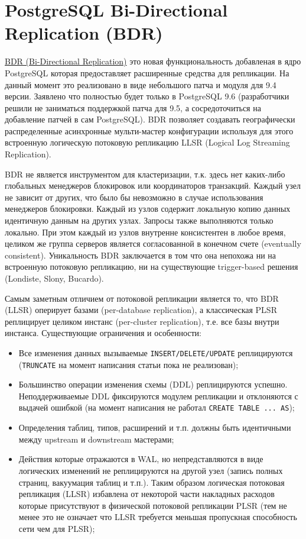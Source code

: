 \section{PostgreSQL Bi-Directional Replication (BDR)}
\label{sec:bdr}

\href{https://2ndquadrant.com/en/resources/bdr/}{BDR (Bi-Directional Replication)} это новая функциональность добавленая в ядро PostgreSQL которая предоставляет расширенные средства для репликации. На данный момент это реализовано в виде небольшого патча и модуля для 9.4 версии. Заявлено что полностью будет только в PostgreSQL 9.6 (разработчики решили не заниматься поддержкой патча для 9.5, а сосредоточиться на добавление патчей в сам PostgreSQL). BDR позволяет создавать географически распределенные асинхронные мульти-мастер конфигурации используя для этого встроенную логическую потоковую репликацию LLSR (Logical Log Streaming Replication).

BDR не является инструментом для кластеризации, т.к. здесь нет каких-либо глобальных менеджеров блокировок или координаторов транзакций. Каждый узел не зависит от других, что было бы невозможно в случае использования менеджеров блокировки. Каждый из узлов содержит локальную копию данных идентичную данным на других узлах. Запросы также выполняются только локально. При этом каждый из узлов внутренне консистентен в любое время, целиком же группа серверов является согласованной в конечном счете (eventually consistent). Уникальность BDR заключается в том что она непохожа ни на встроенную потоковую репликацию, ни на существующие trigger-based решения (Londiste, Slony, Bucardo).

Самым заметным отличием от потоковой репликации является то, что BDR (LLSR) оперирует базами (per-database replication), а классическая PLSR реплицирует целиком инстанс (per-cluster replication), т.е. все базы внутри инстанса. Существующие ограничения и особенности:

\begin{itemize}
  \item Все изменения данных вызываемые \lstinline!INSERT/DELETE/UPDATE! реплицируются (\lstinline!TRUNCATE! на момент написания статьи пока не реализован);
  \item Большинство операции изменения схемы (DDL) реплицируются успешно. Неподдерживаемые DDL фиксируются модулем репликации и отклоняются с выдачей ошибкой (на момент написания не работал \lstinline!CREATE TABLE ... AS!);
  \item Определения таблиц, типов, расширений и т.п. должны быть идентичными между upstream и downstream мастерами;
  \item Действия которые отражаются в WAL, но непредставляются в виде логических изменений не реплицируются на другой узел (запись полных страниц, вакуумация таблиц и т.п.). Таким образом логическая потоковая репликация (LLSR) избавлена от некоторой части накладных расходов которые присутствуют в физической потоковой репликации PLSR (тем не менее это не означает что LLSR требуется меньшая пропускная способность сети чем для PLSR);
\end{itemize}

